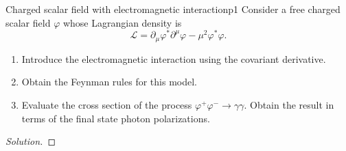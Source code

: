 \begin{problem}{Charged scalar field with electromagnetic interaction}{p1}
   Consider a free charged scalar field \(\varphi\) whose Lagrangian density is
   \begin{equation*}
      \mathcal{L} = \partial_\mu \varphi^* \partial^\mu \varphi - \mu^2 \varphi^* \varphi.
   \end{equation*}
   \begin{enumerate}[label=(\alph*)]
       \item Introduce the electromagnetic interaction using the covariant derivative.
       \item Obtain the Feynman rules for this model.
       \item Evaluate the cross section of the process \(\varphi^+ \varphi^- \to \gamma \gamma.\) Obtain the result in terms of the final state photon polarizations.
   \end{enumerate}
\end{problem}
\begin{proof}[Solution]
    
\end{proof}
